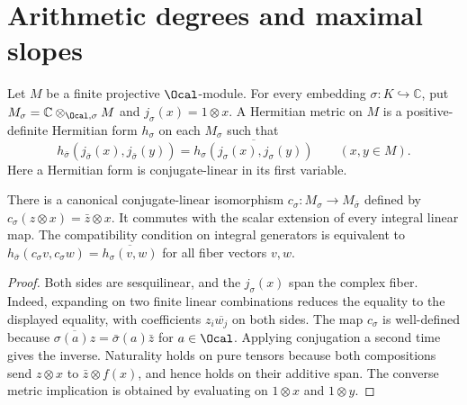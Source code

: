 \chapter{Arithmetic degrees and maximal slopes}

\begin{definition}
\label{def:hermitian-metric}
\leanok
Let $M$ be a finite projective $\Ocal$-module. For every embedding
$\sigma:K\hookrightarrow\mathbb C$, put
$M_\sigma=\mathbb C\otimes_{\Ocal,\sigma}M$ and $j_\sigma(x)=1\otimes x$.
A Hermitian metric on $M$ is a positive-definite Hermitian form $h_\sigma$
on each $M_\sigma$ such that
\[
 h_{\bar\sigma}(j_{\bar\sigma}(x),j_{\bar\sigma}(y))
 =\overline{h_\sigma(j_\sigma(x),j_\sigma(y))}\qquad(x,y\in M).
\]
Here a Hermitian form is conjugate-linear in its first variable.
\end{definition}

\begin{lemma}
\label{lem:hermitian-fiber-conjugation}
\leanok
There is a canonical conjugate-linear isomorphism
$c_\sigma:M_\sigma\to M_{\bar\sigma}$ defined by
$c_\sigma(z\otimes x)=\bar z\otimes x$. It commutes with the
scalar extension of every integral linear map. The compatibility condition
on integral generators is equivalent to
$h_{\bar\sigma}(c_\sigma v,c_\sigma w)=\overline{h_\sigma(v,w)}$
for all fiber vectors $v,w$.
\end{lemma}
\begin{proof}
Both sides are sesquilinear,
and the $j_\sigma(x)$ span the complex fiber. Indeed, expanding on two finite
linear combinations reduces the equality to the displayed equality, with
coefficients $z_i\overline{w_j}$ on both sides. The map $c_\sigma$ is
well-defined because $\overline{\sigma(a)z}=\bar\sigma(a)\bar z$ for
$a\in\Ocal$. Applying conjugation a second time gives the inverse. Naturality holds
on pure tensors because both compositions send $z\otimes x$ to
$\bar z\otimes f(x)$, and hence holds on their additive span.
The converse metric implication is obtained by evaluating on $1\otimes x$
and $1\otimes y$.
\end{proof}

